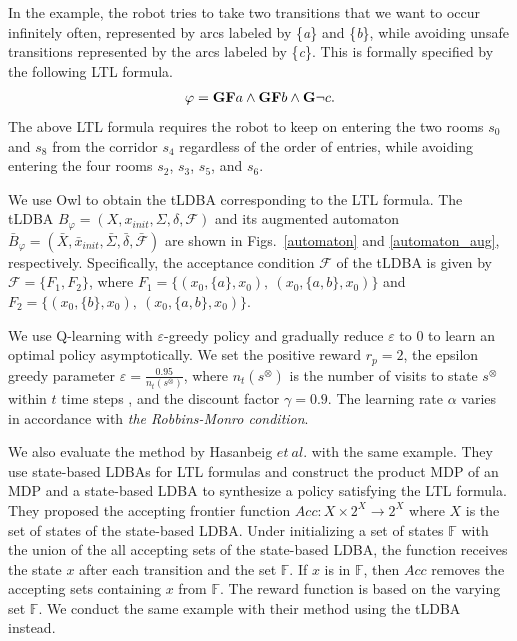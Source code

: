 \documentclass[a4j,12pt,oneside,openany,english,dvipdfmx]{jsbook}
\begin{document}
In the example, the robot tries to take two transitions that we want to occur infinitely often, represented by arcs labeled by \{{\it a}\} and \{{\it b}\}, while avoiding unsafe transitions represented by the arcs labeled by \{{\it c}\}. This is formally specified by the following LTL formula.
\begin{align*}
  \varphi = \text{{\bf GF}}a \wedge \text{{\bf GF}}b \wedge \text{{\bf G}}\neg c.
\end{align*}
The above LTL formula requires the robot to keep on entering the two rooms $s_0$ and $s_8$ from the corridor $s_4$ regardless of the order of entries, while avoiding entering the four rooms $s_2$, $s_3$, $s_5$, and $s_6$.

We use Owl \cite{Owl} to obtain the tLDBA corresponding to the LTL formula.
The tLDBA $B_{\varphi} = (X, x_{init},\Sigma,\delta,\mathcal{F})$ and its augmented automaton $\bar{B}_{\varphi} = (\bar{X},\bar{x}_{init},\bar{\Sigma},\bar{\delta},\bar{\mathcal{F}})$ are shown in Figs.\ \ref{automaton} and \ref{automaton_aug}, respectively. Specifically, the acceptance condition ${\mathcal F}$ of the tLDBA is given by ${\mathcal F} = \{ F_1,F_2 \}$, where $F_1=\{ (x_0, \{ a \}, x_0),\ (x_0, \{ a,b \}, x_0) \}$ and $F_2 = \{ (x_0, \{ b \}, x_0),\ (x_0, \{ a,b \}, x_0) \}$.

We use Q-learning with $\varepsilon$-greedy policy and gradually reduce $\varepsilon$ to 0 to learn an optimal policy asymptotically.
We set the positive reward $r_p = 2$, the epsilon greedy parameter $ \varepsilon = \frac{0.95}{n_t(s^{\otimes})}$, where $n_t(s^{\otimes})$ is the number of visits to state $s^{\otimes}$ within $t$ time steps \cite{Singh1998}, and the discount factor $\gamma = 0.9$. The learning rate $\alpha$ varies in accordance with {\it the Robbins-Monro condition}.

We also evaluate the method by Hasanbeig $et\ al.$\cite{HAK2019} with the same example. They use state-based LDBAs for LTL formulas and construct the product MDP of an MDP and a state-based LDBA to synthesize a policy satisfying the LTL formula. They proposed the accepting frontier function $Acc : X \times 2^X \rightarrow 2^X $ where $X$ is the set of states of the state-based LDBA. Under initializing a set of states $ \mathbb{F} $ with the union of the all accepting sets of the state-based LDBA, the function receives the state $x$ after each transition and the set $\mathbb{F}$. If $x$ is in $\mathbb{F}$, then $Acc$ removes the accepting sets containing $x$ from $\mathbb{F}$. The reward function is based on the varying set $\mathbb{F}$. We conduct the same example with their method using the tLDBA instead.
\end{document}
